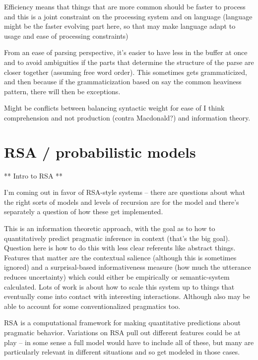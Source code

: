 \documentclass[]{article}
\begin{document}
Efficiency means that things that are more common should be faster to process and this is a joint constraint on the processing system and on language (language might be the faster evolving part here, so that may make language adapt to usage and ease of processing constraints)

From an ease of parsing perspective, it's easier to have less in the buffer at once and to avoid ambiguities if the parts that determine the structure of the parse are closer together (assuming free word order). This sometimes gets grammaticized, and then because if the grammaticization based on say the common heaviness pattern, there will then be exceptions. 

Might be conflicts between balancing syntactic weight for ease of I think comprehension and not production (contra Macdonald?) and information theory. 




\section{RSA / probabilistic models }


** Intro to RSA ** 

I'm coming out in favor of RSA-style systems -- there are questions about what the right sorts of models and levels of recursion are for the model and there's separately a question of how these get implemented. 

\cite{frank2012a} This is an information theoretic approach, with the goal as to how to quantitatively predict pragmatic inference in context (that's the big goal). Question here is how to do this with less clear referents like abstract things. Features that matter are the contextual salience (although this is sometimes ignored) and a surprisal-based informativeness measure (how much the utterance reduces uncertainty) which could either be empirically or semantic-system calculated. Lots of work is about how to scale this system up to things that eventually come into contact with interesting interactions. Although also may be able to account for some conventionalized pragmatics too. 

\cite{goodman2016} RSA is a computational framework for making quantitative predictions about pragmatic behavior. Variations on RSA pull out different features could be at play -- in some sense a full model would have to include all of these, but many are particularly relevant in different situations and so get modeled in those cases. 
\end{document}
